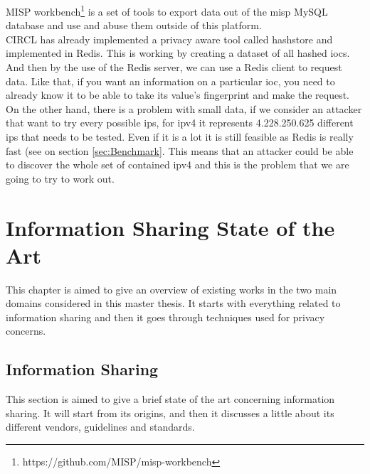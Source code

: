 \documentclass{eplmastersthesis}
\begin{document}
MISP workbench\footnote{https://github.com/MISP/misp-workbench} is a set of tools to export data out of the \gls{misp} MySQL database and use and abuse them outside of this platform.\\

CIRCL has already implemented a privacy aware tool called hashstore and implemented in Redis. This is working by creating a dataset of all hashed \glspl{ioc}. And then by the use of the Redis server, we can use a Redis client to request data.
Like that, if you want an information on a particular \gls{ioc}, you need to already know it to be able to take its value's fingerprint and make the request.\\

On the other hand, there is a problem with small data, if we consider an attacker that want to try every possible \glspl{ip}, for \gls{ipv4} it represents 4.228.250.625 different \glspl{ip} that needs to be tested. Even if it is a lot it is still feasible as Redis is really fast (see on section \ref{sec:Benchmark}. This means that an attacker could be able to discover the whole set of contained \gls{ipv4} and this is the problem that we are going to try to work out.


\chapter{Information Sharing State of the Art}

This chapter is aimed to give an overview of existing works in the two main domains considered in this master thesis. It starts with everything related to information sharing and then it goes through techniques used for privacy concerns.\\

\section{Information Sharing}
This section is aimed to give a brief state of the art concerning information sharing. It will start from its origins, and then it discusses a little about its different vendors, guidelines and standards.
\end{document}
